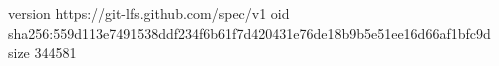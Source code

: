 version https://git-lfs.github.com/spec/v1
oid sha256:559d113e7491538ddf234f6b61f7d420431e76de18b9b5e51ee16d66af1bfc9d
size 344581
